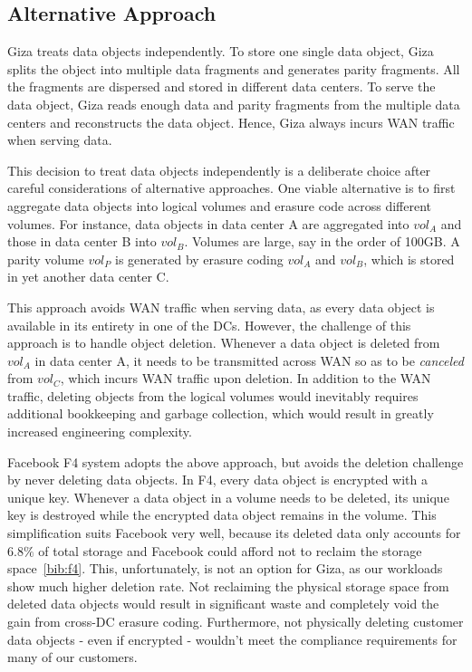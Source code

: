 \subsection{Alternative Approach}

Giza treats data objects independently. To store one single data object, Giza splits the object into multiple data fragments and generates parity fragments. All the fragments are dispersed and stored in different data centers. To serve the data object, Giza reads enough data and parity fragments from the multiple data centers and reconstructs the data object. Hence, Giza always incurs WAN traffic when serving data.

This decision to treat data objects independently is a deliberate choice after careful considerations of alternative approaches. One viable alternative is to first aggregate data objects into logical volumes and erasure code across different volumes. For instance, data objects in data center A are aggregated into $vol_A$ and those in data center B into $vol_B$. Volumes are large, say in the order of 100GB. A parity volume $vol_P$ is generated by erasure coding $vol_A$ and $vol_B$, which is stored in yet another data center C.

This approach avoids WAN traffic when serving data, as every data object is available in its entirety in one of the DCs. However, the challenge of this approach is to handle object deletion. Whenever a data object is deleted from $vol_A$ in data center A, it needs to be transmitted across WAN so as to be {\em canceled} from $vol_C$, which incurs WAN traffic upon deletion. In addition to the WAN traffic, deleting objects from the logical volumes would inevitably requires additional bookkeeping and garbage collection, which would result in greatly increased engineering complexity.

Facebook F4 system adopts the above approach, but avoids the deletion challenge by never deleting data objects. In F4, every data object is encrypted with a unique key. Whenever a data object in a volume needs to be deleted, its unique key is destroyed while the encrypted data object remains in the volume. This simplification suits Facebook very well, because its deleted data only accounts for $6.8\%$ of total storage and Facebook could afford not to reclaim the storage space~\ref{bib:f4}. This, unfortunately, is not an option for Giza, as our workloads show much higher deletion rate. Not reclaiming the physical storage space from deleted data objects would result in significant waste and completely void the gain from cross-DC erasure coding. Furthermore, not physically deleting customer data objects - even if encrypted - wouldn't meet the compliance requirements for many of our customers.

